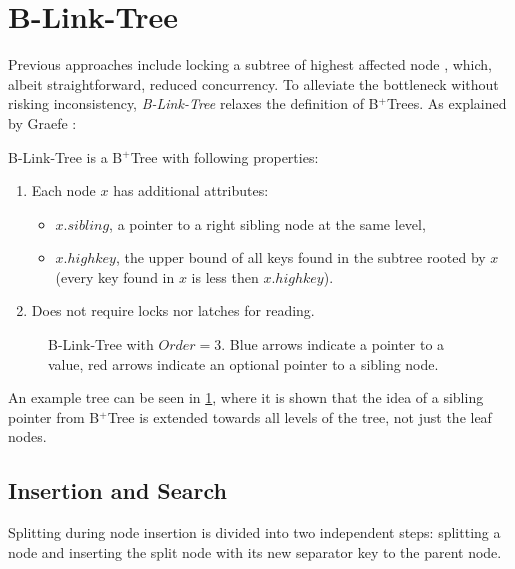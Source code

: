 \section{B-Link-Tree}\label{section:b-link-tree}

Previous approaches include locking a subtree of highest affected node \cite{samadi1976b}, which, albeit straightforward, reduced concurrency. To alleviate the bottleneck without risking inconsistency, \textit{B-Link-Tree} relaxes the definition of B$^+$Trees. As explained by Graefe \cite{goetz-tech}:

\begin{definition}
  B-Link-Tree is a B$^+$Tree with following properties:
  \begin{enumerate}
    \item Each node $x$ has additional attributes:
          \begin{itemize}
            \item $x.\mathit{sibling}$, a pointer to a right sibling node at the same level,
            \item $x.highkey$, the upper bound of all keys found in the subtree rooted by $x$ (every key found in $x$ is less then $x.highkey$).
          \end{itemize}
    \item Does not require locks nor latches for reading.
  \end{enumerate}
\end{definition}

\begin{figure}[H]
  \centering
  
  \caption[B-Link-Tree with $\mathit{Order} = 3$.]{B-Link-Tree with $\mathit{Order} = 3$. Blue arrows indicate a pointer to a value, red arrows indicate an optional pointer to a sibling node.}
  \label{figure:b-link-tree}
\end{figure}

An example tree can be seen in \cref{figure:b-link-tree}, where it is shown that the idea of a sibling pointer from B$^+$Tree is extended towards all levels of the tree, not just the leaf nodes.

\subsection{Insertion and Search}

Splitting during node insertion is divided into two independent steps: splitting a node and inserting the split node with its new separator key to the parent node.

